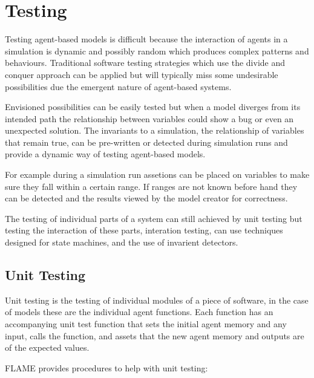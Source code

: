 \section{Testing}

Testing agent-based models is difficult because the interaction of agents in a
simulation is dynamic and possibly random which produces complex patterns and
behaviours. Traditional software testing strategies which use the divide and
conquer approach can be applied but will typically miss some undesirable
possibilities due the emergent nature of agent-based systems.

Envisioned possibilities can be easily tested but when a model diverges from
its intended path the relationship between variables could show a bug or even
an unexpected solution. The invariants to a simulation, the relationship of
variables that remain true, can be pre-written or detected during simulation
runs and provide a dynamic way of testing agent-based models.

For example during a simulation run assetions can be placed on variables to
make sure they fall within a certain range. If ranges are not known before hand
they can be detected and the results viewed by the model creator for
correctness.

The testing of individual parts of a system can still achieved by unit testing
but testing the interaction of these parts, interation testing, can use
techniques designed for state machines, and the use of invarient detectors.

\subsection{Unit Testing}

Unit testing is the testing of individual modules of a piece of software, in the
case of models these are the individual agent functions. Each function has an
accompanying unit test function that sets the initial agent memory and any input,
calls the function, and assets that the new agent memory and outputs are of the
expected values.

FLAME provides procedures to help with unit testing:

